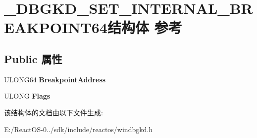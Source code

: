 \hypertarget{struct___d_b_g_k_d___s_e_t___i_n_t_e_r_n_a_l___b_r_e_a_k_p_o_i_n_t64}{}\section{\+\_\+\+D\+B\+G\+K\+D\+\_\+\+S\+E\+T\+\_\+\+I\+N\+T\+E\+R\+N\+A\+L\+\_\+\+B\+R\+E\+A\+K\+P\+O\+I\+N\+T64结构体 参考}
\label{struct___d_b_g_k_d___s_e_t___i_n_t_e_r_n_a_l___b_r_e_a_k_p_o_i_n_t64}
\subsection*{Public 属性}
\begin{DoxyCompactItemize}
\item 
\mbox{\label{struct___d_b_g_k_d___s_e_t___i_n_t_e_r_n_a_l___b_r_e_a_k_p_o_i_n_t64_a1998be485416bc13c6488146d863da62}} 
U\+L\+O\+N\+G64 {\bfseries Breakpoint\+Address}
\item 
\mbox{\label{struct___d_b_g_k_d___s_e_t___i_n_t_e_r_n_a_l___b_r_e_a_k_p_o_i_n_t64_a3f6c65ce52219e16f048ac6c01c71399}} 
U\+L\+O\+NG {\bfseries Flags}
\end{DoxyCompactItemize}


该结构体的文档由以下文件生成\+:\begin{DoxyCompactItemize}
\item 
E\+:/\+React\+O\+S-\/0../sdk/include/reactos/windbgkd.\+h\end{DoxyCompactItemize}
